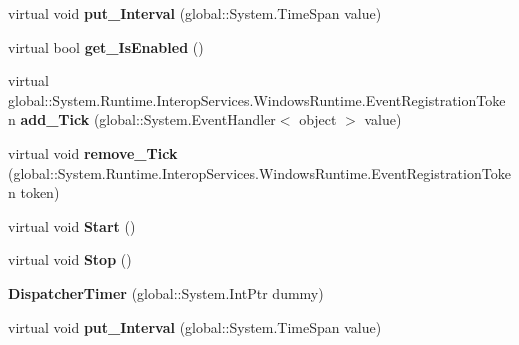 \begin{DoxyCompactItemize}
\item 
\mbox{\label{class_windows_1_1_u_i_1_1_xaml_1_1_dispatcher_timer_a87fbb85d7540c9ede1de8c5586bab52b}} 
virtual void {\bfseries put\+\_\+\+Interval} (global\+::\+System.\+Time\+Span value)
\item 
\mbox{\label{class_windows_1_1_u_i_1_1_xaml_1_1_dispatcher_timer_aa01da6df2d38218542106e2b5024d1ad}} 
virtual bool {\bfseries get\+\_\+\+Is\+Enabled} ()
\item 
\mbox{\label{class_windows_1_1_u_i_1_1_xaml_1_1_dispatcher_timer_afec18a9d2af7458ea713ce3d73bf8fc8}} 
virtual global\+::\+System.\+Runtime.\+Interop\+Services.\+Windows\+Runtime.\+Event\+Registration\+Token {\bfseries add\+\_\+\+Tick} (global\+::\+System.\+Event\+Handler$<$ object $>$ value)
\item 
\mbox{\label{class_windows_1_1_u_i_1_1_xaml_1_1_dispatcher_timer_a2dead21112a95b1c2d77308cd76f9917}} 
virtual void {\bfseries remove\+\_\+\+Tick} (global\+::\+System.\+Runtime.\+Interop\+Services.\+Windows\+Runtime.\+Event\+Registration\+Token token)
\item 
\mbox{\label{class_windows_1_1_u_i_1_1_xaml_1_1_dispatcher_timer_ace863a2c747bd7aa446b55fd38eaca7e}} 
virtual void {\bfseries Start} ()
\item 
\mbox{\label{class_windows_1_1_u_i_1_1_xaml_1_1_dispatcher_timer_a8465a583b290d1ba135b41f118bb7e91}} 
virtual void {\bfseries Stop} ()
\item 
\mbox{\label{class_windows_1_1_u_i_1_1_xaml_1_1_dispatcher_timer_a46c10638999c5f9db1a7102ce752b5e1}} 
{\bfseries Dispatcher\+Timer} (global\+::\+System.\+Int\+Ptr dummy)
\item 
\mbox{\label{class_windows_1_1_u_i_1_1_xaml_1_1_dispatcher_timer_a87fbb85d7540c9ede1de8c5586bab52b}} 
virtual void {\bfseries put\+\_\+\+Interval} (global\+::\+System.\+Time\+Span value)

\end{DoxyCompactItemize}
